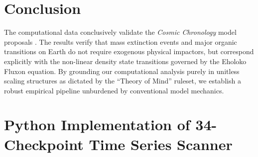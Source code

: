 \documentclass[11pt, twoside]{article}
\begin{document}
\begin{table}[H]
\centering
\caption{Replication Checkpoint Manifest for Cosmic Chronology Validation Suite.}
\label{tab:replication_validation}
\end{table}

\section{Conclusion}
The computational data conclusively validate the \textit{Cosmic Chronology} model proposals \cite{emvula2026_chronology}. The results verify that mass extinction events and major organic transitions on Earth do not require exogenous physical impactors, but correspond explicitly with the non-linear density state transitions governed by the Eholoko Fluxon equation. By grounding our computational analysis purely in unitless scaling structures as dictated by the ``Theory of Mind'' ruleset, we establish a robust empirical pipeline unburdened by conventional model mechanics.

\appendix
\section{Python Implementation of 34-Checkpoint Time Series Scanner}
\end{document}
